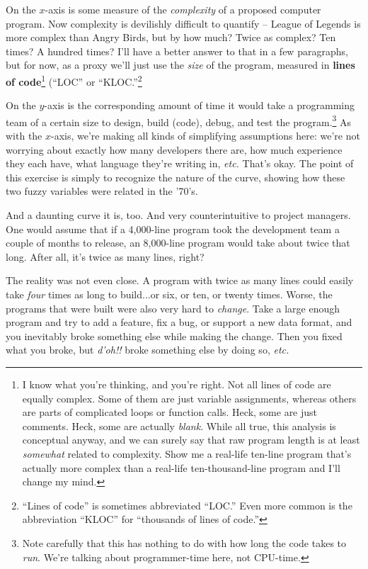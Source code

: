 On the $x$-axis is some measure of the \textit{complexity} of a proposed
computer program. Now complexity is devilishly difficult to quantify -- League
of Legends is more complex than Angry Birds, but by how much? Twice as
complex? Ten times? A hundred times? I'll have a better answer to that in a
few paragraphs, but for now, as a proxy we'll just use the \textit{size} of
the program, measured in \textbf{lines of code}\footnote{I know what you're
thinking, and you're right. Not all lines of code are equally complex. Some of
them are just variable assignments, whereas others are parts of complicated
loops or function calls. Heck, some are just comments. Heck, some are actually
\textit{blank}. While all true, this analysis is conceptual anyway, and we can
surely say that raw program length is at least \textit{somewhat} related to
complexity. Show me a real-life ten-line program that's actually more complex
than a real-life ten-thousand-line program and I'll change my mind.} (``LOC''
or ``KLOC.''\footnote{``Lines of code'' is sometimes abbreviated ``LOC.'' Even
more common is the abbreviation ``KLOC'' for ``thousands of lines of code.''}

On the $y$-axis is the corresponding amount of time it would take a programming
team of a certain size to design, build (code), debug, and test the
program.\footnote{Note carefully that this has nothing to do with how long the
code takes to \textit{run}. We're talking about programmer-time here, not
CPU-time.} As with the $x$-axis, we're making all kinds of simplifying
assumptions here: we're not worrying about exactly how many developers there
are, how much experience they each have, what language they're writing in,
\textit{etc.} That's okay. The point of this exercise is simply to recognize
the nature of the curve, showing how these two fuzzy variables were related in
the '70's.

And a daunting curve it is, too. And very counterintuitive to project
managers. One would assume that if a 4,000-line program took the development
team a couple of months to release, an 8,000-line program would take about
twice that long. After all, it's twice as many lines, right?

The reality was not even close. A program with twice as many lines could
easily take \textit{four} times as long to build...or six, or ten, or twenty
times. Worse, the programs that were built were also very hard to
\textit{change}. Take a large enough program and try to add a feature, fix a
bug, or support a new data format, and you inevitably broke something else
while making the change. Then you fixed what you broke, but \textit{d'oh!!}
broke something else by doing so, \textit{etc.}

